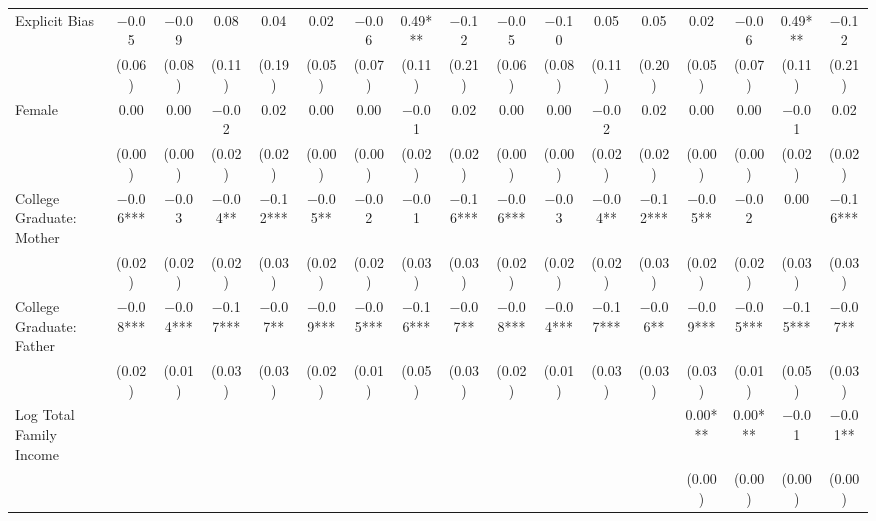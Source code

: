 \begin{landscape}
\begin{table}[H]
{\begin{threeparttable}
\begin{tabular}[t]{lcccccccccccccccc}
\midrule
Explicit Bias & \num{-0.05} & \num{-0.09} & \num{0.08} & \num{0.04} & \num{0.02} & \num{-0.06} & \num{0.49}*** & \num{-0.12} & \num{-0.05} & \num{-0.10} & \num{0.05} & \num{0.05} & \num{0.02} & \num{-0.06} & \num{0.49}*** & \num{-0.12}\\
 & (\num{0.06}) & (\num{0.08}) & (\num{0.11}) & (\num{0.19}) & (\num{0.05}) & (\num{0.07}) & (\num{0.11}) & (\num{0.21}) & (\num{0.06}) & (\num{0.08}) & (\num{0.11}) & (\num{0.20}) & (\num{0.05}) & (\num{0.07}) & (\num{0.11}) & (\num{0.21})\\
Female & \num{0.00} & \num{0.00} & \num{-0.02} & \num{0.02} & \num{0.00} & \num{0.00} & \num{-0.01} & \num{0.02} & \num{0.00} & \num{0.00} & \num{-0.02} & \num{0.02} & \num{0.00} & \num{0.00} & \num{-0.01} & \num{0.02}\\
 & (\num{0.00}) & (\num{0.00}) & (\num{0.02}) & (\num{0.02}) & (\num{0.00}) & (\num{0.00}) & (\num{0.02}) & (\num{0.02}) & (\num{0.00}) & (\num{0.00}) & (\num{0.02}) & (\num{0.02}) & (\num{0.00}) & (\num{0.00}) & (\num{0.02}) & (\num{0.02})\\
College Graduate: Mother & \num{-0.06}*** & \num{-0.03} & \num{-0.04}** & \num{-0.12}*** & \num{-0.05}** & \num{-0.02} & \num{-0.01} & \num{-0.16}*** & \num{-0.06}*** & \num{-0.03} & \num{-0.04}** & \num{-0.12}*** & \num{-0.05}** & \num{-0.02} & \num{0.00} & \num{-0.16}***\\
 & (\num{0.02}) & (\num{0.02}) & (\num{0.02}) & (\num{0.03}) & (\num{0.02}) & (\num{0.02}) & (\num{0.03}) & (\num{0.03}) & (\num{0.02}) & (\num{0.02}) & (\num{0.02}) & (\num{0.03}) & (\num{0.02}) & (\num{0.02}) & (\num{0.03}) & (\num{0.03})\\
College Graduate: Father & \num{-0.08}*** & \num{-0.04}*** & \num{-0.17}*** & \num{-0.07}** & \num{-0.09}*** & \num{-0.05}*** & \num{-0.16}*** & \num{-0.07}** & \num{-0.08}*** & \num{-0.04}*** & \num{-0.17}*** & \num{-0.06}** & \num{-0.09}*** & \num{-0.05}*** & \num{-0.15}*** & \num{-0.07}**\\
 & (\num{0.02}) & (\num{0.01}) & (\num{0.03}) & (\num{0.03}) & (\num{0.02}) & (\num{0.01}) & (\num{0.05}) & (\num{0.03}) & (\num{0.02}) & (\num{0.01}) & (\num{0.03}) & (\num{0.03}) & (\num{0.03}) & (\num{0.01}) & (\num{0.05}) & (\num{0.03})\\
Log Total Family Income &  &  &  &  &  &  &  &  &  &  &  &  & \num{0.00}*** & \num{0.00}*** & \num{-0.01} & \num{-0.01}**\\
 &  &  &  &  &  &  &  &  &  &  &  &  & (\num{0.00}) & (\num{0.00}) & (\num{0.00}) & (\num{0.00})\\

\end{tabular}
\end{threeparttable}}
\end{table}
\end{landscape}
